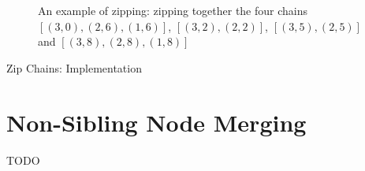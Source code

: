 \documentclass[10pt,twocolumn,twoside]{IEEEtran}
\newenvironment{stusubfig}[1]
{
	\begin{figure}[#1]
	\begin{center}
}
{
	\end{center}
	\end{figure}
}
\begin{document}
\begin{stusubfig}{p}
	\hspace{8mm}%
\caption{An example of zipping: zipping together the four chains $[(3,0), (2,6), (1,6)]$, $[(3,2), (2,2)]$, $[(3,5), (2,5)]$ and $[(3,8), (2,8), (1,8)]$}
\label{fig:ipfs-forest-zipping}
\end{stusubfig}

\begin{stulisting}[p]
\caption{Zip Chains: Implementation}
\label{code:ipfs-forest-zipchains}

\end{stulisting}

\section{Non-Sibling Node Merging}
\label{sec:nsmerge}

TODO
\end{document}
